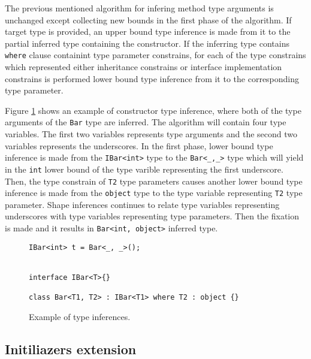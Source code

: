 The previous mentioned algorithm for infering method type arguments is unchanged except collecting new bounds in the first phase of the algorithm.
If target type is provided, an upper bound type inference is made from it to the partial inferred type containing the constructor.
If the inferring type contains \texttt{where} clause containint type parameter constrains, for each of the type constrains which represented either inheritance constrains or interface implementation constrains is performed lower bound type inference from it to the corresponding type parameter.
\par
Figure \ref{img62:ctro} shows an example of constructor type inference, where both of the type arguments of the \texttt{Bar} type are inferred.
The algorithm will contain four type variables. The first two variables represents type arguments and the second two variables represents the underscores.
In the first phase, lower bound type inference is made from the \texttt{IBar<int>} type to the \texttt{Bar<\_,\_>} type which will yield in the \texttt{int} lower bound of the type varible representing the first underscore.
Then, the type constrain of \texttt{T2} type parameters causes another lower bound type inference is made from the \texttt{object} type to the type variable representing \texttt{T2} type parameter.
Shape inferences continues to relate type variables representing underscores with type variables representing type parameters.
Then the fixation is made and it results in \texttt{Bar<int, object>} inferred type.
\begin{figure}[h!]
\begin{lstlisting}[style=csharp, mathescape=true]
IBar<int> t = Bar<_, _>();


interface IBar<T>{}

class Bar<T1, T2> : IBar<T1> where T2 : object {}
\end{lstlisting}
\caption{Example of type inferences.}
\label{img62:ctro}
\end{figure}

\subsection{Initiliazers extension}

